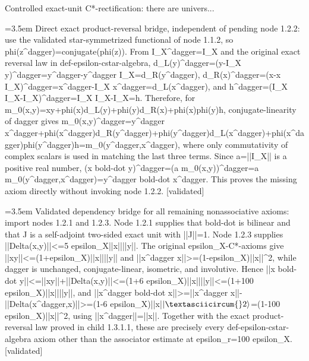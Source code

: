 \documentclass{article}
\newcommand{\step}[1]{\par\noindent\hangindent=3.5em\hangafter=1%
  \makebox[3.5em][l]{\textbf{#1.}}}
\newcommand{\steptag}[1]{\hfill{\small\textsf{[#1]}}}
\begin{document}
\begin{proofbox}{Controlled exact-unit C*-rectification: there are univers...}
\step{1.3.1.1} Direct exact product-reversal bridge, independent of pending node 1.2.2: use the validated star-symmetrized functional of node 1.1.2, so phi(z\textasciicircum{}dagger)=conjugate(phi(z)). From I\_X\textasciicircum{}dagger=I\_X and the original exact reversal law in def-epsilon-cstar-algebra, d\_L(y)\textasciicircum{}dagger=(y-I\_X y)\textasciicircum{}dagger=y\textasciicircum{}dagger-y\textasciicircum{}dagger I\_X=d\_R(y\textasciicircum{}dagger), d\_R(x)\textasciicircum{}dagger=(x-x I\_X)\textasciicircum{}dagger=x\textasciicircum{}dagger-I\_X x\textasciicircum{}dagger=d\_L(x\textasciicircum{}dagger), and h\textasciicircum{}dagger=(I\_X I\_X-I\_X)\textasciicircum{}dagger=I\_X I\_X-I\_X=h. Therefore, for m\_0(x,y)=xy+phi(x)d\_L(y)+phi(y)d\_R(x)+phi(x)phi(y)h, conjugate-linearity of dagger gives m\_0(x,y)\textasciicircum{}dagger=y\textasciicircum{}dagger x\textasciicircum{}dagger+phi(x\textasciicircum{}dagger)d\_R(y\textasciicircum{}dagger)+phi(y\textasciicircum{}dagger)d\_L(x\textasciicircum{}dagger)+phi(x\textasciicircum{}dagger)phi(y\textasciicircum{}dagger)h=m\_0(y\textasciicircum{}dagger,x\textasciicircum{}dagger), where only commutativity of complex scalars is used in matching the last three terms. Since a=||I\_X|| is a positive real number, (x bold-dot y)\textasciicircum{}dagger=(a m\_0(x,y))\textasciicircum{}dagger=a m\_0(y\textasciicircum{}dagger,x\textasciicircum{}dagger)=y\textasciicircum{}dagger bold-dot x\textasciicircum{}dagger. This proves the missing axiom directly without invoking node 1.2.2. \steptag{validated} \\[4pt]
\step{1.3.1.2} Validated dependency bridge for all remaining nonassociative axioms: import nodes 1.2.1 and 1.2.3. Node 1.2.1 supplies that bold-dot is bilinear and that J is a self-adjoint two-sided exact unit with ||J||=1. Node 1.2.3 supplies ||Delta(x,y)||<=5 epsilon\_X||x||||y||. The original epsilon\_X-C*-axioms give ||xy||<=(1+epsilon\_X)||x||||y|| and ||x\textasciicircum{}dagger x||>=(1-epsilon\_X)||x||\textasciicircum{}2, while dagger is unchanged, conjugate-linear, isometric, and involutive. Hence ||x bold-dot y||<=||xy||+||Delta(x,y)||<=(1+6 epsilon\_X)||x||||y||<=(1+100 epsilon\_X)||x||||y||, and ||x\textasciicircum{}dagger bold-dot x||>=||x\textasciicircum{}dagger x||-||Delta(x\textasciicircum{}dagger,x)||>=(1-6 epsilon\_X)||x|$|\textasciicircum{}2\rangle$=(1-100 epsilon\_X)||x||\textasciicircum{}2, using ||x\textasciicircum{}dagger||=||x||. Together with the exact product-reversal law proved in child 1.3.1.1, these are precisely every def-epsilon-cstar-algebra axiom other than the associator estimate at epsilon\_r=100 epsilon\_X. \steptag{validated} \\[6pt]

\end{proofbox}
\end{document}
